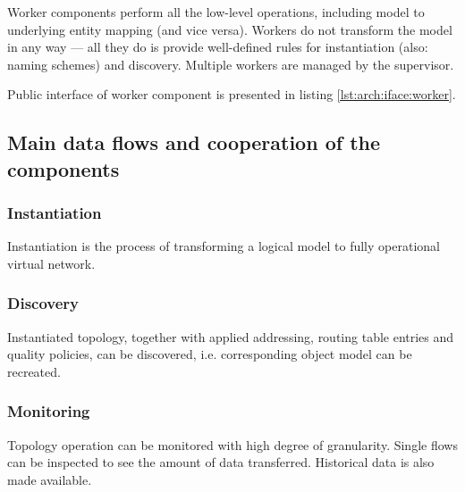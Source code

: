 \documentclass[11pt]{book}
\begin{document}
          Worker components perform all the low-level operations, including model to underlying entity mapping (and vice
          versa). Workers do not transform the model in any way --- all they do is provide well-defined rules for
          instantiation (also: naming schemes) and discovery. Multiple workers are managed by the supervisor.

          Public interface of worker component is presented in listing \ref{lst:arch:iface:worker}. \\

          \noindent
          \begin{minipage}{\textwidth}
            
          \end{minipage}





      \subsection{Main data flows and cooperation of the components}

        \subsubsection{Instantiation}

          Instantiation is the process of transforming a logical model to fully operational virtual network.


        \subsubsection{Discovery}

          Instantiated topology, together with applied addressing, routing table entries and quality policies, can be
          discovered, i.e. corresponding object model can be recreated.


        \subsubsection{Monitoring}

          Topology operation can be monitored with high degree of granularity. Single flows can be inspected to see the
          amount of data transferred. Historical data is also made available.
\end{document}
